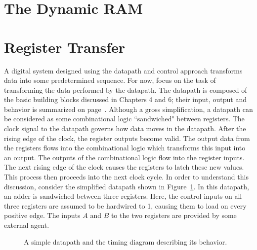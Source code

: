 \section{The Dynamic RAM}
\pagebreak

\section{Register Transfer}
A digital system designed using the datapath and control approach 
transforms data into some predetermined sequence.  For now, focus 
on the task of transforming the data performed by the datapath.  
The datapath is composed of the basic building blocks discussed in 
Chapters 4 and 6; their input, output and behavior is summarized on 
page~\pageref{page:boxlist}.  Although a gross simplification, a 
datapath can be considered as some combinational logic ``sandwiched" 
between registers.  The clock signal to the datapath governs how 
data moves in the datapath. After the rising edge of the clock, the 
register outputs become valid. The output data from the registers 
flows into the combinational logic which transforms this input into 
an output.  The outputs of the combinational logic flow into the 
register inputs.  The next rising edge of the clock causes the 
registers to latch these new values.  This process then proceeds 
into the next clock cycle.  In order to understand this discussion, 
consider the simplified datapath shown in Figure~\ref{fig:simple}.  
In this datapath, an adder is sandwiched between three registers.  
Here, the control inputs on all three registers are assumed to be 
hardwired to 1, causing them to load on every positive edge.  The 
inputs $A$ and $B$ to the two registers are provided by some 
external agent.
  
\begin{figure}[ht]

\caption{A simple datapath and the timing diagram describing its
behavior.}
\label{fig:simple}

\end{figure}

